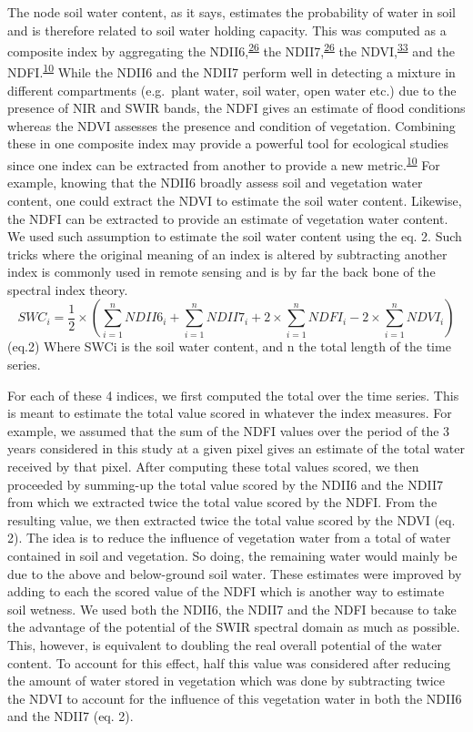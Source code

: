 \documentclass[12pt,oneside]{article}
\begin{document}
The node soil water content, as it says, estimates the probability of water in soil and is therefore related to soil water holding capacity. This was computed as a composite index by aggregating the NDII6,\textsuperscript{\protect\hyperlink{ref-Hunt_and_Rock_1989}{26}} the NDII7,\textsuperscript{\protect\hyperlink{ref-Hunt_and_Rock_1989}{26}} the NDVI,\textsuperscript{\protect\hyperlink{ref-Tucker_1979}{33}} and the NDFI.\textsuperscript{\protect\hyperlink{ref-Boschetti_et_al_2014}{10}} While the NDII6 and the NDII7 perform well in detecting a mixture in different compartments (e.g.~plant water, soil water, open water etc.) due to the presence of NIR and SWIR bands, the NDFI gives an estimate of flood conditions whereas the NDVI assesses the presence and condition of vegetation. Combining these in one composite index may provide a powerful tool for ecological studies since one index can be extracted from another to provide a new metric.\textsuperscript{\protect\hyperlink{ref-Boschetti_et_al_2014}{10}} For example, knowing that the NDII6 broadly assess soil and vegetation water content, one could extract the NDVI to estimate the soil water content. Likewise, the NDFI can be extracted to provide an estimate of vegetation water content. We used such assumption to estimate the soil water content using the eq. 2. Such tricks where the original meaning of an index is altered by subtracting another index is commonly used in remote sensing and is by far the back bone of the spectral index theory.
\[SWC_i = \frac{1}{2}\times ( \sum_{i=1}^{n} NDII6_i + \sum_{i=1}^{n}NDII7_i + 2\times \sum_{i=1}^{n}NDFI_i - 2\times \sum_{i=1}^{n}NDVI_i )\] (eq.2)
Where SWCi is the soil water content, and n the total length of the time series.

For each of these 4 indices, we first computed the total over the time series. This is meant to estimate the total value scored in whatever the index measures. For example, we assumed that the sum of the NDFI values over the period of the 3 years considered in this study at a given pixel gives an estimate of the total water received by that pixel. After computing these total values scored, we then proceeded by summing-up the total value scored by the NDII6 and the NDII7 from which we extracted twice the total value scored by the NDFI. From the resulting value, we then extracted twice the total value scored by the NDVI (eq. 2). The idea is to reduce the influence of vegetation water from a total of water contained in soil and vegetation. So doing, the remaining water would mainly be due to the above and below-ground soil water. These estimates were improved by adding to each the scored value of the NDFI which is another way to estimate soil wetness. We used both the NDII6, the NDII7 and the NDFI because to take the advantage of the potential of the SWIR spectral domain as much as possible. This, however, is equivalent to doubling the real overall potential of the water content. To account for this effect, half this value was considered after reducing the amount of water stored in vegetation which was done by subtracting twice the NDVI to account for the influence of this vegetation water in both the NDII6 and the NDII7 (eq. 2).
\end{document}
